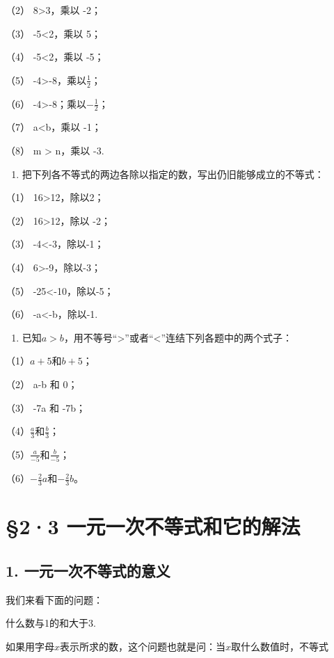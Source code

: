 （2） 8\textgreater3，乘以 -2；

（3） -5\textless2，乘以 5；

（4） -5\textless2，乘以 -5；

（5） -4\textgreater-8，乘以\(\frac{1}{2}\)；

（6） -4\textgreater-8；乘以\(-\frac{1}{2}\)；

（7） a\textless b，乘以 -1；

（8） m \textgreater{} n，乘以 -3.

\begin{enumerate}[start=3]
\item
  把下列各不等式的两边各除以指定的数，写出仍旧能够成立的不等式：
\end{enumerate}

（1） 16\textgreater12，除以2；

（2） 16\textgreater12，除以 -2；

（3） -4\textless-3，除以-1；

（4） 6\textgreater-9，除以-3；

（5） -25\textless-10，除以-5；

（6） -a\textless-b，除以-1.

\begin{enumerate}[start=4]
\item
  已知\(a > b\)，用不等号``\textgreater''或者``\textless''连结下列各题中的两个式子：
\end{enumerate}

（1）\(a + 5\)和\(b + 5\)；

（2） a-b 和 0；

（3） -7a 和 -7b；

（4）\(\frac{a}{3}\)和\(\frac{b}{3}\)；

（5）\(\frac{a}{-5}\)和\(\frac{b}{-5}\)；

（6）\(-\frac{2}{3} a\)和\(-\frac{2}{3} b\)。

\section{§2·3 一元一次不等式和它的解法}

\subsection{1. 一元一次不等式的意义}

我们来看下面的问题：

什么数与1的和大于3.

如果用字母\(x\)表示所求的数，这个问题也就是问：当\(x\)取什么数值时，不等式

